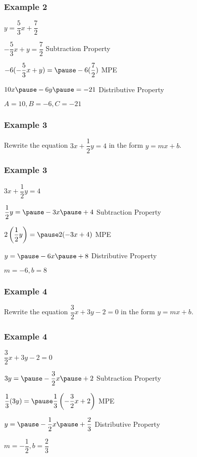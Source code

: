 \documentclass[14pt]{beamer}
\begin{document}
    \begin{frame}
    	\frametitle{Example 2}
    	$ y = \dfrac{5}{3}x + \dfrac{7}{2} $
    	
    	\vone $ -\dfrac{5}{3}x + y = \dfrac{7}{2} $ \void Subtraction Property
    	
    	\vone $ -6(-\dfrac{5}{3}x + y) = \pause -6(\dfrac{7}{2}) $ \pause \void MPE
    	
    	\pause \vone $ 10x \pause - 6y \pause = -21 $ \pause \void Distributive Property
    	
    	\pause \vone $ A = 10, B = -6, C = -21$
    \end{frame}

    \begin{frame}
    	\frametitle{Example 3}
    	Rewrite the equation $ 3x + \dfrac{1}{2}y = 4 $ in the form $ y = mx + b $.
    \end{frame}

   \begin{frame}
   	\frametitle{Example 3}
   	$ 3x + \dfrac{1}{2}y = 4 $
   	
   	\pause \vone $ \dfrac{1}{2}y = \pause -3x \pause + 4 $ \void Subtraction Property
   	
   	\pause \vone $ 2\left(\dfrac{1}{2}y \right) = \pause 2(-3x + 4) $ \pause \void MPE
   	
   	\pause \vone $ y = \pause -6x \pause + 8 $ \pause \void Distributive Property
   	
   	\pause \vone $ m = -6, b = 8$
   \end{frame}

    \begin{frame}
    	\frametitle{Example 4}
    	Rewrite the equation $ \dfrac{3}{2}x + 3y - 2 =  0$ in the form $ y = mx + b $.
    \end{frame}

    \begin{frame}
    	\frametitle{Example 4}
    	$ \dfrac{3}{2}x + 3y - 2 =  0$ 
    	
    	\pause \vone $ 3y = \pause -\dfrac{3}{2}x \pause + 2 $ \void Subtraction Property
    	
    	\pause \vone $ \dfrac{1}{3}(3y ) = \pause \dfrac{1}{3}\left(-\dfrac{3}{2}x + 2\right) $ \pause \void MPE
    	
    	\pause \vone $ y = \pause -\dfrac{1}{2}x \pause + \dfrac{2}{3} $ \pause \void Distributive Property
    	
    	\pause \vone $ m = -\dfrac{1}{2}, b = \dfrac{2}{3}$
    \end{frame}
\end{document}
